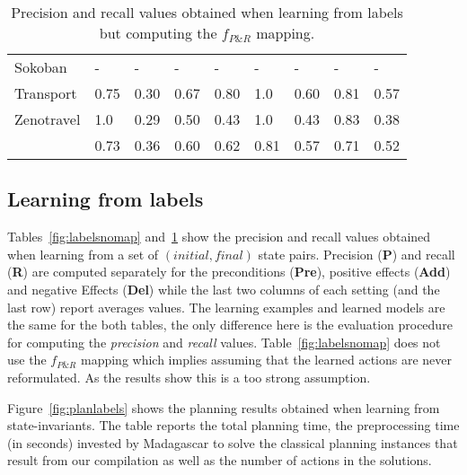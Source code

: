\documentclass{article}
\begin{document}
\begin{table}
\begin{center}
\begin{scriptsize}
\begin{tabular}{l|l|l|l|l|l|l||l|l|}
					Sokoban & - & - & - & - & - & - & - & - \\ %
					Transport & 0.75 & 0.30 & 0.67 & 0.80 & 1.0 & 0.60 & 0.81 & 0.57 \\
					Zenotravel & 1.0 & 0.29 & 0.50 & 0.43 & 1.0 & 0.43 & 0.83 & 0.38 \\
					\hline
					\bf  & 0.73 & 0.36 & 0.60 & 0.62 & 0.81 & 0.57 & 0.71 & 0.52 \\
				\end{tabular}
	\end{scriptsize}
		\end{center}
 \caption{\small Precision and recall values obtained when learning from labels but computing the $f_{P\&R}$ mapping.}
\label{fig:labels}                
\end{table}

\subsection{Learning from labels}
Tables~\ref{fig:labelsnomap} and~\ref{fig:labels} show the precision and recall values obtained when learning from a set of $(initial, final)$ state pairs. Precision ({\bf P}) and recall ({\bf R}) are computed separately for the preconditions ({\bf Pre}), positive effects ({\bf Add}) and negative Effects ({\bf Del}) while the last two columns of each setting (and the last row) report averages values. The learning examples and learned models are the same for the both tables, the only difference here is the evaluation procedure for computing the {\em precision} and {\em recall} values. Table~\ref{fig:labelsnomap} does not use the $f_{P\&R}$ mapping which implies assuming that the learned actions are never reformulated. As the results show this is a too strong assumption. 


Figure~\ref{fig:planlabels} shows the planning results obtained when learning from state-invariants. The table reports the total planning time, the preprocessing time (in seconds) invested by {\sc Madagascar} to solve the classical planning instances that result from our compilation as well as the number of actions in the solutions. 
\end{document}
